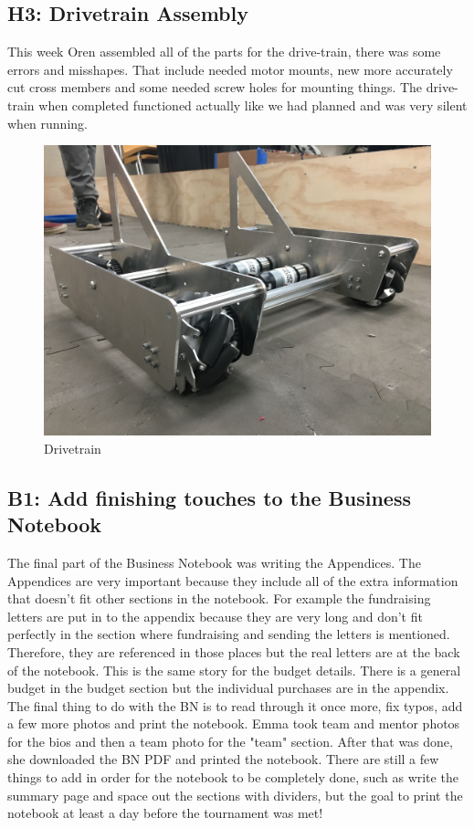\documentclass{article}
\begin{document}
\subsection{H3: Drivetrain Assembly}

This week Oren assembled all of the parts for the drive-train, there was some errors and misshapes. That include needed motor mounts, new more accurately cut cross members and some needed   screw holes for mounting things. The drive-train when completed functioned actually like we had planned and was very silent when running.    

\begin{figure}
    \centering
    \includegraphics[width=.6 \textwidth]{10_11-05/images/drivetrain.JPG}
    \caption{Drivetrain}
    \label{fig:drivetrain}
\end{figure}
\subsection{B1: Add finishing touches to the Business Notebook}

The final part of the Business Notebook was writing the Appendices. The Appendices are very important because they include all of the extra information that doesn't fit other sections in the notebook. For example the fundraising letters are put in to the appendix because they are very long and don't fit perfectly in the section where fundraising and sending the letters is mentioned. Therefore, they are referenced in those places but the real letters are at the back of the notebook. This is the same story for the budget details. There is a general budget in the budget section but the individual purchases are in the appendix. \\
The final thing to do with the BN is to read through it once more, fix typos, add a few more photos and print the notebook. Emma took team and mentor photos for the bios and then a team photo for the "team" section. After that was done, she downloaded the BN PDF and printed the notebook. There are still a few things to add in order for the notebook to be completely done, such as write the summary page and space out the sections with dividers, but the goal to print the notebook at least a day before the tournament was met!
\end{document}
